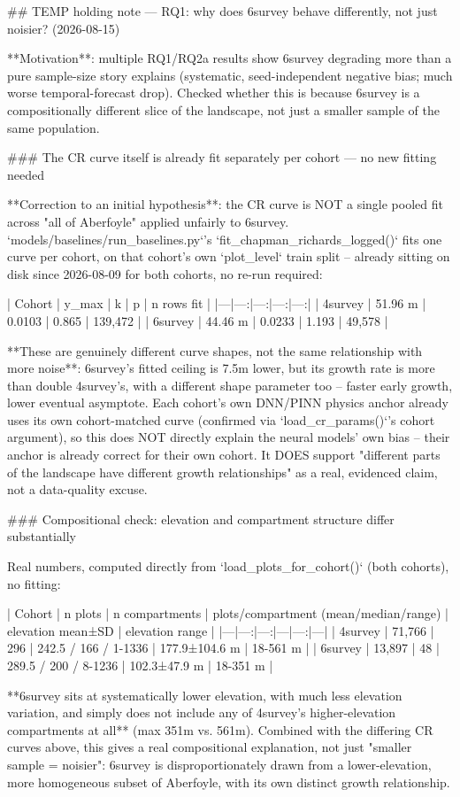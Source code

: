 ## TEMP holding note — RQ1: why does 6survey behave differently, not just noisier? (2026-08-15)

**Motivation**: multiple RQ1/RQ2a results show 6survey degrading more than a pure sample-size
story explains (systematic, seed-independent negative bias; much worse temporal-forecast drop).
Checked whether this is because 6survey is a compositionally different slice of the landscape,
not just a smaller sample of the same population.

### The CR curve itself is already fit separately per cohort — no new fitting needed

**Correction to an initial hypothesis**: the CR curve is NOT a single pooled fit across "all of
Aberfoyle" applied unfairly to 6survey. `models/baselines/run_baselines.py`'s
`fit_chapman_richards_logged()` fits one curve per cohort, on that cohort's own `plot_level` train
split -- already sitting on disk since 2026-08-09 for both cohorts, no re-run required:

| Cohort | y_max | k | p | n rows fit |
|---|---:|---:|---:|---:|
| 4survey | 51.96 m | 0.0103 | 0.865 | 139,472 |
| 6survey | 44.46 m | 0.0233 | 1.193 | 49,578 |

**These are genuinely different curve shapes, not the same relationship with more noise**:
6survey's fitted ceiling is 7.5m lower, but its growth rate is more than double 4survey's, with a
different shape parameter too -- faster early growth, lower eventual asymptote. Each cohort's own
DNN/PINN physics anchor already uses its own cohort-matched curve (confirmed via
`load_cr_params()`'s cohort argument), so this does NOT directly explain the neural models' own
bias -- their anchor is already correct for their own cohort. It DOES support "different parts of
the landscape have different growth relationships" as a real, evidenced claim, not a data-quality
excuse.

### Compositional check: elevation and compartment structure differ substantially

Real numbers, computed directly from `load_plots_for_cohort()` (both cohorts), no fitting:

| Cohort | n plots | n compartments | plots/compartment (mean/median/range) | elevation mean±SD | elevation range |
|---|---:|---:|---|---:|---|
| 4survey | 71,766 | 296 | 242.5 / 166 / 1-1336 | 177.9±104.6 m | 18-561 m |
| 6survey | 13,897 | 48 | 289.5 / 200 / 8-1236 | 102.3±47.9 m | 18-351 m |

**6survey sits at systematically lower elevation, with much less elevation variation, and simply
does not include any of 4survey's higher-elevation compartments at all** (max 351m vs. 561m).
Combined with the differing CR curves above, this gives a real compositional explanation, not just
"smaller sample = noisier": 6survey is disproportionately drawn from a lower-elevation, more
homogeneous subset of Aberfoyle, with its own distinct growth relationship.

